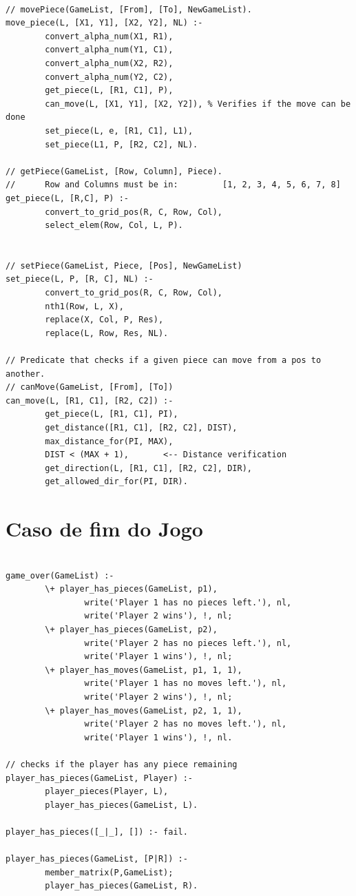 \begin{lstlisting}

// movePiece(GameList, [From], [To], NewGameList).
move_piece(L, [X1, Y1], [X2, Y2], NL) :-
        convert_alpha_num(X1, R1),
        convert_alpha_num(Y1, C1),
        convert_alpha_num(X2, R2),
        convert_alpha_num(Y2, C2),
        get_piece(L, [R1, C1], P),
        can_move(L, [X1, Y1], [X2, Y2]), % Verifies if the move can be done
        set_piece(L, e, [R1, C1], L1),
        set_piece(L1, P, [R2, C2], NL).

// getPiece(GameList, [Row, Column], Piece).
//      Row and Columns must be in:         [1, 2, 3, 4, 5, 6, 7, 8]
get_piece(L, [R,C], P) :-
        convert_to_grid_pos(R, C, Row, Col),
        select_elem(Row, Col, L, P).


// setPiece(GameList, Piece, [Pos], NewGameList)
set_piece(L, P, [R, C], NL) :-
        convert_to_grid_pos(R, C, Row, Col),
        nth1(Row, L, X),
        replace(X, Col, P, Res),
        replace(L, Row, Res, NL).

// Predicate that checks if a given piece can move from a pos to another.
// canMove(GameList, [From], [To])
can_move(L, [R1, C1], [R2, C2]) :-
        get_piece(L, [R1, C1], PI),
        get_distance([R1, C1], [R2, C2], DIST),
        max_distance_for(PI, MAX),
        DIST < (MAX + 1),       <-- Distance verification
        get_direction(L, [R1, C1], [R2, C2], DIR),
        get_allowed_dir_for(PI, DIR).

\end{lstlisting}

\newpage

\section{Caso de fim do Jogo}

\begin{lstlisting}

game_over(GameList) :-
        \+ player_has_pieces(GameList, p1),
                write('Player 1 has no pieces left.'), nl,
                write('Player 2 wins'), !, nl;
        \+ player_has_pieces(GameList, p2),
                write('Player 2 has no pieces left.'), nl,
                write('Player 1 wins'), !, nl;
        \+ player_has_moves(GameList, p1, 1, 1),
                write('Player 1 has no moves left.'), nl,
                write('Player 2 wins'), !, nl;
        \+ player_has_moves(GameList, p2, 1, 1),
                write('Player 2 has no moves left.'), nl,
                write('Player 1 wins'), !, nl.

// checks if the player has any piece remaining
player_has_pieces(GameList, Player) :-
        player_pieces(Player, L),
        player_has_pieces(GameList, L).

player_has_pieces([_|_], []) :- fail.

player_has_pieces(GameList, [P|R]) :-
        member_matrix(P,GameList);
        player_has_pieces(GameList, R).

\end{lstlisting}

